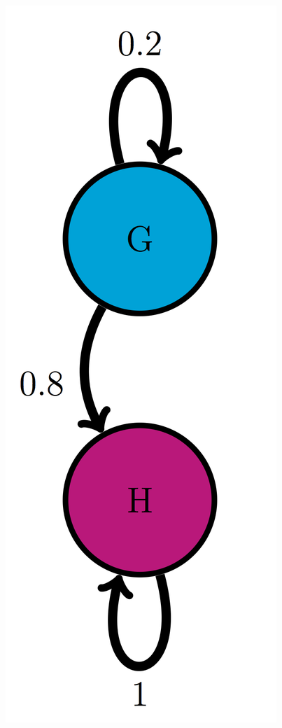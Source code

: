 \documentclass[
]{book}
\theoremstyle{definition}
\theoremstyle{definition}
\theoremstyle{definition}
\theoremstyle{remark}
\begin{document}
\includegraphics{ch10/GH_trans_diag.png}
\end{document}
